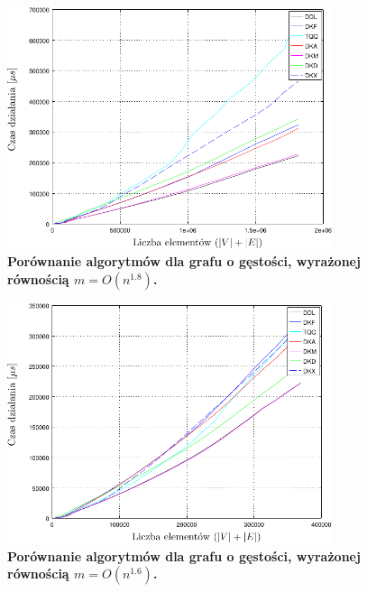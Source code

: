 \begin{figure}[!htbp]
	\centering
	\includegraphics[width=0.85\textwidth]{Chapter_IV/graph180_psfrag.pdf}
	\caption{\textbf{ Porównanie algorytmów dla grafu o gęstości, wyrażonej równością $ m = O \left( n^{1.8} \right)$.}}\label{fig:plotFullGraph_1.80}
\end{figure}

\begin{figure}[!htbp]
	\centering
	\includegraphics[width=0.85\textwidth]{Chapter_IV/graph160_psfrag.pdf}
	\caption{\textbf{ Porównanie algorytmów dla grafu o gęstości, wyrażonej równością $ m = O \left( n^{1.6} \right)$.}}\label{fig:plotFullGraph_1.60}
\end{figure}

